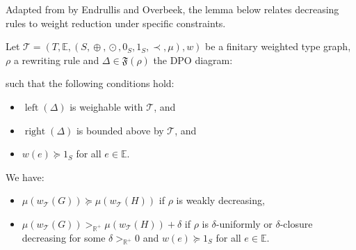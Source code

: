 Adapted from \cite[Theorem C.3]{endrullis2024generalized_arxiv_v2} by Endrullis and Overbeek, the lemma below relates decreasing rules to weight reduction under specific constraints. 
\begin{lemma}
    \label{nwf:lem:decreasing_step}
    Let $\mathcal{T} \mathop{=} (T,\mathbb{E}, (S, \mathop{\oplus}, \mathop{\odot}, 0_S, 1_S, \prec, \mu), w)$ be a finitary weighted type graph, $\rho$ a rewriting rule and $\Delta \mathop{\in} \mathfrak{F}(\rho)$ the DPO diagram:
       \begin{center}
      \end{center}
    such that the following conditions hold:
 
   \begin{itemize}
       \item $\operatorname{left}(\Delta)$ is weighable with \(\mathcal{T}\), and
       \item $\operatorname{right}(\Delta)$ is bounded above by \(\mathcal{T}\), and
       \item $w(e) \mathop{\succeq} 1_S$ for all $e \mathop{\in} \mathbb{E}$.
   \end{itemize}

   \noindent
  We have:
   \begin{itemize}
       \item $\mu(w_\mathcal{T}(G)) \mathop{\succeq} \mu(w_\mathcal{T}(H))$ if $\rho$ is weakly decreasing,
       \item $\mu(w_\mathcal{T}(G)) >_{\mathbb{R}^+} \mu(w_\mathcal{T}(H))\mathop{+}\delta$ if $\rho$ is $\delta$-uniformly or $\delta$-closure decreasing for some $\delta >_{\mathbb{R}^+} 0$ and $w(e) \mathop{\succeq} 1_S$ for all $e \mathop{\in} \mathbb{E}$.
   \end{itemize}
\end{lemma} 

